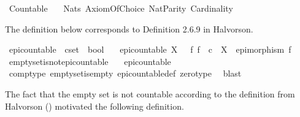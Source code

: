 %
\begin{isabellebody}%
%
%
\isadelimdocument
%
\endisadelimdocument
%
\isatagdocument
%
\isamarkuptrue%
%
\endisatagdocument
{\isafolddocument}%
%
\isadelimdocument
%
\endisadelimdocument
%
\isadelimtheory
%
\endisadelimtheory
%
\isatagtheory
{}\isamarkupfalse%
\ Countable\isanewline
\ \ \ Nats\ Axiom{\isacharunderscore}{\kern0pt}Of{\isacharunderscore}{\kern0pt}Choice\ Nat{\isacharunderscore}{\kern0pt}Parity\ Cardinality\isanewline
{}%
\endisatagtheory
{\isafoldtheory}%
%
\isadelimtheory
%
\endisadelimtheory
%
\begin{isamarkuptext}%
The definition below corresponds to Definition 2.6.9 in Halvorson.%
\end{isamarkuptext}\isamarkuptrue%
\isamarkupfalse%
\ epi{\isacharunderscore}{\kern0pt}countable\ {\isacharcolon}{\kern0pt}{\isacharcolon}{\kern0pt}\ {\isachardoublequoteopen}cset\ {\isasymRightarrow}\ bool{\isachardoublequoteclose}\ \isanewline
\ \ {\isachardoublequoteopen}epi{\isacharunderscore}{\kern0pt}countable\ X\ {\isasymlongleftrightarrow}\ {\isacharparenleft}{\kern0pt}{\isasymexists}\ f{\isachardot}{\kern0pt}\ f\ {\isacharcolon}{\kern0pt}\ {\isasymnat}\isactrlsub c\ {\isasymrightarrow}\ X\ {\isasymand}\ epimorphism\ f{\isacharparenright}{\kern0pt}{\isachardoublequoteclose}\isanewline
\isanewline
{}\isamarkupfalse%
\ emptyset{\isacharunderscore}{\kern0pt}is{\isacharunderscore}{\kern0pt}not{\isacharunderscore}{\kern0pt}epi{\isacharunderscore}{\kern0pt}countable{\isacharcolon}{\kern0pt}\isanewline
\ \ {\isachardoublequoteopen}{\isasymnot}\ epi{\isacharunderscore}{\kern0pt}countable\ {\isasymemptyset}{\isachardoublequoteclose}\isanewline
%
\isadelimproof
\ \ %
\endisadelimproof
%
\isatagproof
{}\isamarkupfalse%
\ comp{\isacharunderscore}{\kern0pt}type\ emptyset{\isacharunderscore}{\kern0pt}is{\isacharunderscore}{\kern0pt}empty\ epi{\isacharunderscore}{\kern0pt}countable{\isacharunderscore}{\kern0pt}def\ zero{\isacharunderscore}{\kern0pt}type\ \isamarkupfalse%
\ blast%
\endisatagproof
{\isafoldproof}%
%
\isadelimproof
%
\endisadelimproof
%
\begin{isamarkuptext}%
The fact that the empty set is not countable according to the definition from Halvorson
  () motivated the following definition.%

\end{isamarkuptext}
\end{isabellebody}

